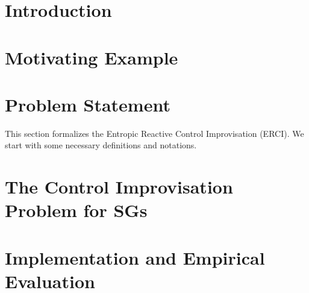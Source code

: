 \documentclass[conference]{IEEEtran}
\theoremstyle{remark}
\newcommand{\sg}{\mathcal{G}}
\newcommand{\eventually}[1]{\lozenge^{\leq #1}}
\newcommand{\sched}{\sigma}
\begin{document}
\section{Introduction}

\section{Motivating Example}
\label{sec:motivating}


\section{Problem Statement}
\label{sec:problem}
This section formalizes the Entropic Reactive Control Improvisation (ERCI).  We start with some necessary definitions and notations.








 
\section{The Control Improvisation Problem for SGs}\label{sec:sgs}

%


\section{Implementation and Empirical Evaluation}
\label{sec:empirical}











\end{document}
